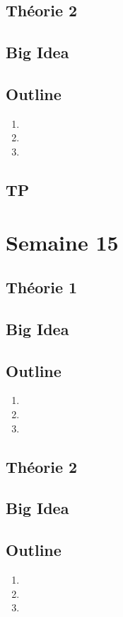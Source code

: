 \documentclass{article}
\begin{document}
\subsection{Théorie 2}
\subsection*{Big Idea}
\subsection*{Outline}
    \begin{enumerate}
    \item
    \item
    \item
    \end{enumerate}
\subsection{TP}

\pagebreak
\section{Semaine 15}
\subsection{Théorie 1}
\subsection*{Big Idea}
\subsection*{Outline}
    \begin{enumerate}
    \item
    \item
    \item
    \end{enumerate}
\subsection{Théorie 2}
\subsection*{Big Idea}
\subsection*{Outline}
    \begin{enumerate}
    \item
    \item
    \item
    \end{enumerate}
\end{document}
